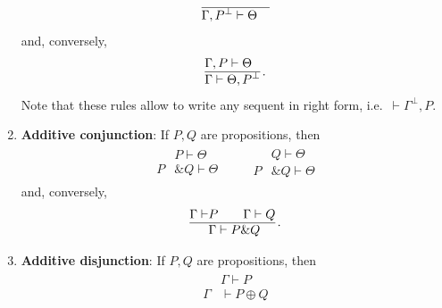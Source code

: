 \begin{enumerate}
\begin{gather}
\begin{aligned}
                    \hline
                    &\Gamma,P^\perp\vdash\Theta
                \end{aligned}
            \end{gather}
            and, conversely,
            \begin{gather}
                \label{quantum_information:negation_rule}
                \begin{aligned}
                    &\Gamma,P\vdash\Theta\\
                    \hline
                    &\Gamma\vdash\Theta,P^\perp
                \end{aligned}\,.
            \end{gather}
            Note that these rules allow to write any sequent in right form, i.e.~$\vdash\Gamma^\perp,P$.
        \item\textbf{Additive conjunction}: If $P,Q$ are propositions, then
            \begin{gather}
                \begin{aligned}
                    &P\vdash\Theta\\
                    \hline
                    P&\& Q\vdash\Theta
                \end{aligned}
                \qquad
                \begin{aligned}
                    &Q\vdash\Theta\\
                    \hline
                    P&\& Q\vdash\Theta
                \end{aligned}
            \end{gather}
            and, conversely,
            \begin{gather}
                \begin{aligned}
                    \Gamma\vdash&P\qquad\Gamma\vdash Q\\
                    \hline
                    &\Gamma\vdash P\&Q
                \end{aligned}\,.
            \end{gather}
        \item\textbf{Additive disjunction}: If $P,Q$ are propositions, then
            \begin{gather}
                \begin{aligned}
                    &\Gamma\vdash P\\
                    \hline
                    \Gamma&\vdash P\oplus Q
                \end{aligned}

\end{gather}
\end{enumerate}
